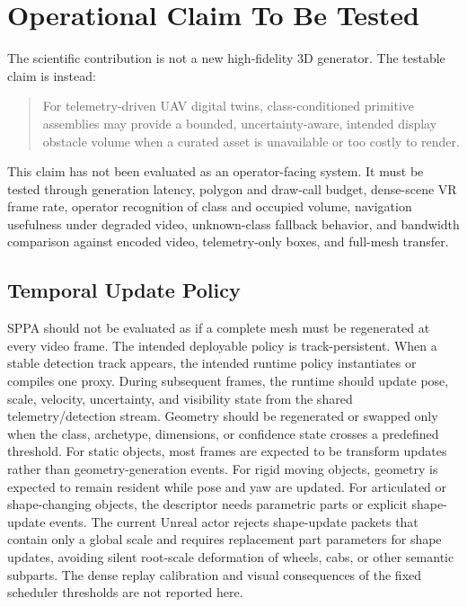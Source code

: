 ﻿\documentclass[11pt,a4paper]{article}
\begin{document}
\section{Operational Claim To Be Tested}

The scientific contribution is not a new high-fidelity 3D generator. The
testable claim is instead:

\begin{quote}
For telemetry-driven UAV digital twins, class-conditioned primitive assemblies
may provide a bounded, uncertainty-aware, intended display obstacle volume
when a curated asset is unavailable or too costly to render.
\end{quote}

This claim has not been evaluated as an operator-facing system. It must be tested through
generation latency, polygon and draw-call budget, dense-scene VR frame rate,
operator recognition of class and occupied volume, navigation usefulness under
degraded video, unknown-class fallback behavior, and bandwidth comparison
against encoded video, telemetry-only boxes, and full-mesh transfer.

\subsection{Temporal Update Policy}

SPPA should not be evaluated as if a complete mesh must be regenerated at every
video frame. The intended deployable policy is track-persistent. When a stable
detection track appears, the intended runtime policy instantiates or compiles
one proxy. During subsequent frames, the runtime should update pose, scale,
velocity, uncertainty, and visibility state from the shared telemetry/detection
stream. Geometry should be regenerated or swapped only when the class,
archetype, dimensions, or confidence state crosses a predefined threshold. For
static objects, most frames are expected to be transform updates rather than
geometry-generation events. For rigid moving objects, geometry is expected to
remain resident while pose and yaw are updated. For articulated or
shape-changing objects, the descriptor needs parametric parts or explicit
shape-update events. The current Unreal actor
rejects shape-update packets that contain only a global scale and requires
replacement part parameters for shape updates, avoiding silent root-scale
deformation of wheels, cabs, or other semantic subparts. The dense replay
calibration and visual consequences of the fixed scheduler thresholds are not
reported here.
\end{document}
